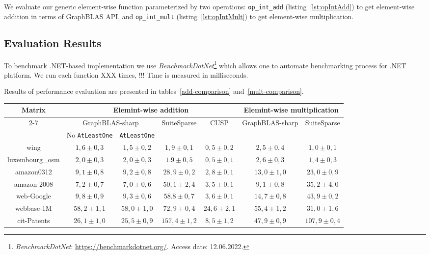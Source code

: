 We evaluate our generic element-wise function parameterized by two operations: \texttt{op\_int\_add} (listing~\ref{lst:opIntAdd}) to get element-wise addition in terms of GraphBLAS API, and \texttt{op\_int\_mult} (listing~\ref{lst:opIntMult}) to get element-wise multiplication.


\subsection{Evaluation Results}

To benchmark .NET-based implementation we use \textit{BenchmarkDotNet}\footnote{\textit{BenchmarkDotNet}: \url{https://benchmarkdotnet.org/}. Access date: 12.06.2022.} which allows one to automate benchmarking process for .NET platform.
We run each function XXX times, !!!
Time is measured in milliseconds.

Results of performance evaluation are presented in tables~\ref{add-comparison} and~\ref{mult-comparison}.


\begin{table*}[h]
    \centering    
    \caption{Evaluation results for element-wise operations, time in ms}    
    \label{add-comparison}
    \begin{tabular}{|c|c|c|c|c||c|c|}
    \hline
    \multirow{3}{*}{Matrix} & \multicolumn{4}{|c||}{Elemint-wise addition} & \multicolumn{2}{|c|}{Elemint-wise multiplication}\\    
    \cline{2-7}        
    & \multicolumn{2}{|c|}{GraphBLAS-sharp} & \multirow{2}{*}{SuiteSparse} & \multirow{2}{*}{CUSP} & \multirow{2}{*}{GraphBLAS-sharp} & \multirow{2}{*}{SuiteSparse}        \\
    &No \texttt{AtLeastOne}&\texttt{AtLeastOne}& & & &\\ 
    \hline
    \hline
    wing            & $1,6 \pm 0,3$       & $1,5 \pm 0,2$      & $1,9\pm 0,1$   & $0,5\pm 0,2$   & $2,5 \pm 0,4$       & $1,0 \pm 0,1$\\
    \hline
    luxembourg\_osm & $2,0 \pm 0,3$       & $2,0 \pm 0,3$      & $1.9\pm 0,5$   & $0,5\pm 0,1$  & $2,6 \pm 0,3$       & $1,4 \pm 0,3$ \\
    \hline
    amazon0312      & $9,1 \pm 0,8$       & $9,2 \pm 0,8$     & $28,9\pm 0,2$  & $2,8\pm 0,1$  & $13,0 \pm 1,0$      & $23,0 \pm 0,9$ \\
    \hline
    amazon-2008     & $7,2 \pm 0,7$       & $7,0 \pm 0,6$     & $50,1\pm 2,4$  & $3,5\pm 0,1$ & $9,1 \pm 0,8$       & $35,2 \pm 4,0$  \\
    \hline
    web-Google      & $9,8 \pm 0,9$       & $9,3 \pm 0,6$     & $58.8\pm 0,7$  & $3,6\pm 0,1$  & $14,7 \pm 0,8$      & $43,9 \pm 0,2$ \\
    \hline
    webbase-1M      & $58,2 \pm 1,1$      & $58,0 \pm 1,0$      & $72,9\pm 0,4$  & $24,6\pm 2,1$  & $55,4 \pm 1,2$      & $31,0 \pm 1,6$ \\
    \hline
    cit-Patents     & $26,1 \pm 1,0$      & $25,5 \pm 0,9$      & $157,4\pm 1,2$ & $8,5\pm 1,2$   & $47,9 \pm 0,9$      & $107,9 \pm 0,4$ \\     
    \hline
    \end{tabular}    
\end{table*}


